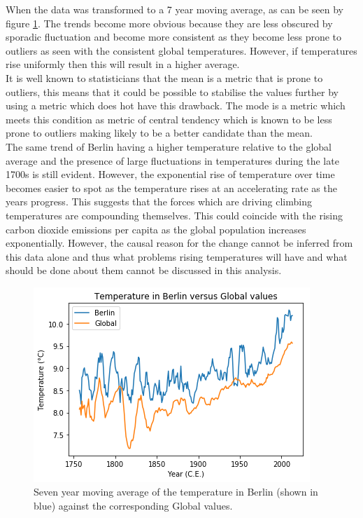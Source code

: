 \documentclass[journal, a4paper]{IEEEtran}
\begin{document}
    When the data was transformed to a 7 year moving average, as can be seen by figure \ref{fig2}. The trends become more obvious because they are less obscured by sporadic fluctuation and become more consistent as they become less prone to outliers as seen with the consistent global temperatures. However, if temperatures rise uniformly then this will result in a higher average.\\
    
    It is well known to statisticians that the mean is a metric that is prone to outliers, this means that it could be possible to stabilise the values further by using a metric which does hot have this drawback. The mode is a metric which meets this condition as metric of central tendency which is known to be less prone to outliers making likely to be a better candidate than the mean.\\
    
    The same trend of Berlin having a higher temperature relative to the global average and the presence of large fluctuations in temperatures during the late 1700s is still evident. However, the exponential rise of temperature over time becomes easier to spot as the temperature rises at an accelerating rate as the years progress. This suggests that the forces which are driving climbing temperatures are compounding themselves. This could coincide with the rising carbon dioxide emissions per capita as the global population increases exponentially. However, the causal reason for the change cannot be inferred from this data alone and thus what problems rising temperatures will have and what should be done about them cannot be discussed in this analysis.\\

	\begin{figure}[tbh]
		\begin{center}
		\includegraphics[width=\columnwidth]{7DayMovingAverageTemperaturePlot.png}
		\caption{Seven year moving average of the temperature in Berlin (shown in blue) against the corresponding Global values.}
		\label{fig2}
		\end{center}
	\end{figure}
    
\end{document}
